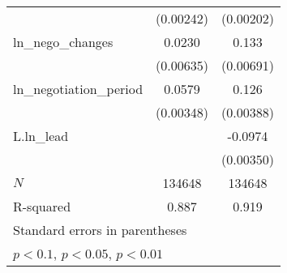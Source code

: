 {\begin{tabular}{l*{2}{c}}
            &   (0.00242)         &   (0.00202)         \\
\addlinespace
ln\_nego\_changes&      0.0230\sym{***}&       0.133\sym{***}\\
            &   (0.00635)         &   (0.00691)         \\
\addlinespace
ln\_negotiation\_period&      0.0579\sym{***}&       0.126\sym{***}\\
            &   (0.00348)         &   (0.00388)         \\
\addlinespace
L.ln\_lead   &                     &     -0.0974\sym{***}\\
            &                     &   (0.00350)         \\
\midrule
\(N\)       &      134648         &      134648         \\
R-squared   &       0.887         &       0.919         \\
\bottomrule
\multicolumn{3}{l}{\footnotesize Standard errors in parentheses}\\
\multicolumn{3}{l}{\footnotesize \sym{*} \(p<0.1\), \sym{**} \(p<0.05\), \sym{***} \(p<0.01\)}\\
\end{tabular}
}

